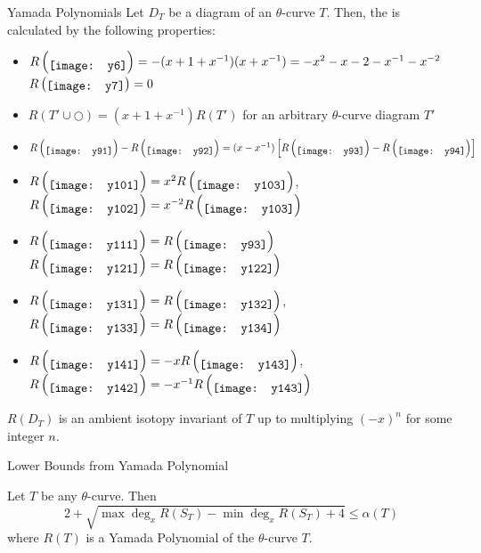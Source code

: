 \begin{frame}{Yamada Polynomials}
	Let $D_T$ be a diagram of an $\theta$-curve $T$.
	Then, the  is calculated by the following properties:
	\begin{itemize}
		\item {} $R\left(\raisebox{-3pt}{\texttt{[image: y6]}}\right)= - (x+1+x^{-1})(x + x^{-1}) = -x^2 - x - 2 - x^{-1} - x^{-2}$\hfill {} $R\left(\raisebox{-1.5pt}{\texttt{[image: y7]}}\right)=0$
		\item {} $R(T'\cup\bigcirc) = (x+1+x^{-1})R(T')$ for an arbitrary $\theta$-curve diagram $T'$
		\item {} $R\left(\raisebox{-3pt}{\texttt{[image: y91]}}\right)-R\left(\raisebox{-3pt}{\texttt{[image: y92]}}\right)=(x-x^{-1})\left[R\left(\raisebox{-3pt}{\texttt{[image: y93]}}\right)-R\left(\raisebox{-3pt}{\texttt{[image: y94]}}\right)\right]$
		\item {} $R\left(\raisebox{-3pt}{\texttt{[image: y101]}}\right) = x^2 R\left(\raisebox{-3pt}{\texttt{[image: y103]}}\right)$,\quad
		$R\left(\raisebox{-3pt}{\texttt{[image: y102]}}\right) = x^{-2} R\left(\raisebox{-3pt}{\texttt{[image: y103]}}\right)$
		\item {} $R\left(\raisebox{-3pt}{\texttt{[image: y111]}}\right) = R\left(\raisebox{-3pt}{\texttt{[image: y93]}}\right)$\hfill
		 $R\left(\raisebox{-3pt}{\texttt{[image: y121]}}\right) = R\left(\raisebox{-3pt}{\texttt{[image: y122]}}\right)$
		\item {} $R\left(\raisebox{-3pt}{\texttt{[image: y131]}}\right) = R\left(\raisebox{-3pt}{\texttt{[image: y132]}}\right)$,\quad $R\left(\raisebox{-3pt}{\texttt{[image: y133]}}\right) = R\left(\raisebox{-3pt}{\texttt{[image: y134]}}\right)$
		\item {} $R\left(\raisebox{-3pt}{\texttt{[image: y141]}}\right) = -x R\left(\raisebox{-3pt}{\texttt{[image: y143]}}\right)$,\quad $R\left(\raisebox{-3pt}{\texttt{[image: y142]}}\right) = -x^{-1}R\left(\raisebox{-3pt}{\texttt{[image: y143]}}\right)$
	\end{itemize}

	\begin{prop}
		$R(D_T)$ is an ambient isotopy invariant of $T$ up to multiplying $(-x)^n$ for some integer $n$.
	\end{prop}
\end{frame}


\begin{frame}{Lower Bounds from Yamada Polynomial}
	\begin{thm}
	Let $T$ be any $\theta$-curve.
	Then
	\[
		2 + \sqrt{\max\deg_xR(S_T) - \min\deg_xR(S_T) + 4} \le \alpha(T)
	\]
	where $R(T)$ is a Yamada Polynomial of the $\theta$-curve $T$.
	\end{thm}	
\end{frame}


